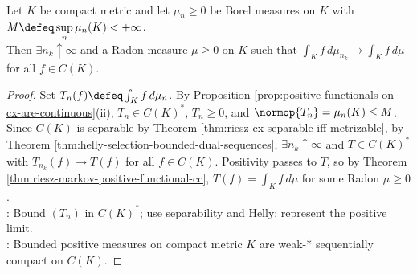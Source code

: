 \begin{corollary} \label{cor:compact-metric-bounded-measures-weak-star-subsequence} \\
Let $K$ be compact metric and let $\mu_n\geq0$ be Borel measures on $K$ with $M\defeq\sup\limits_n\mu_n(K)<+\infty$.\\
Then $\exists n_k\uparrow\infty$ and a Radon measure $\mu\geq0$ on $K$ such that $\int_K f\,d\mu_{n_k}\to\int_K f\,d\mu$ for all $f\in C(K)$.
\begin{proof} Set $T_n(f)\defeq\int_K f\,d\mu_n$. By Proposition \ref{prop:positive-functionals-on-cx-are-continuous}(ii), $T_n\in C(K)^*$, $T_n\geq0$, and $\normop{T_n}=\mu_n(K)\leq M$.\\
Since $C(K)$ is separable by Theorem \ref{thm:riesz-cx-separable-iff-metrizable}, by Theorem \ref{thm:helly-selection-bounded-dual-sequences}, $\exists n_k\uparrow\infty$ and $T\in C(K)^*$ with $T_{n_k}(f)\to T(f)$ for all $f\in C(K)$. Positivity passes to $T$, so by Theorem \ref{thm:riesz-markov-positive-functional-cc}, $T(f)=\int_K f\,d\mu$ for some Radon $\mu\geq0$.\\
: Bound $(T_n)$ in $C(K)^*$; use separability and Helly; represent the positive limit.\\
: Bounded positive measures on compact metric $K$ are weak-* sequentially compact on $C(K)$.
\end{proof}
\end{corollary}
